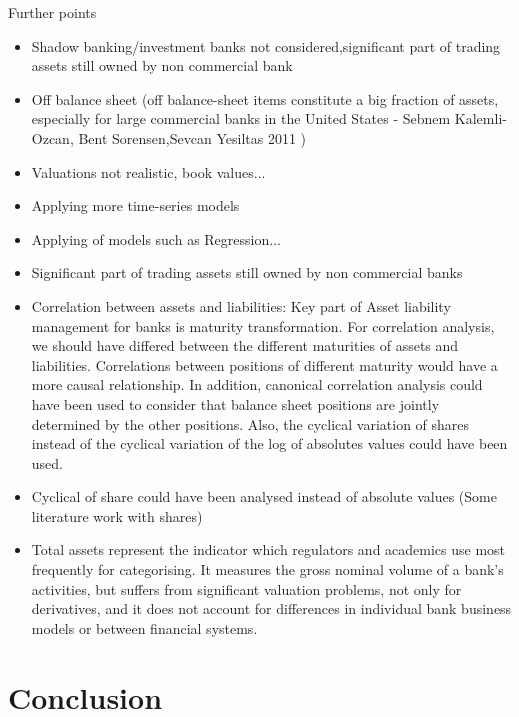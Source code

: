 \documentclass[12pt, a4paper]{article} %
\begin{document}
Further points
\begin{itemize}
\item Shadow banking/investment banks not considered,significant part of trading assets still owned by non commercial bank
\item Off balance sheet (off balance-sheet
items constitute a big fraction of assets, especially for large commercial banks in the United
States - Sebnem Kalemli-Ozcan, Bent Sorensen,Sevcan Yesiltas 2011 )
\item Valuations not realistic, book values...
\item Applying more time-series models
\item Applying of models such as Regression...
\item Significant part of trading assets still owned by non commercial banks
\item Correlation between assets and liabilities: Key part of Asset liability management for banks is maturity transformation. For correlation analysis, we should have differed between the different maturities of assets and liabilities. Correlations between positions of different maturity would have a more causal relationship. In addition, canonical correlation analysis could have been used to consider that balance sheet positions are jointly determined by the other positions. Also, the cyclical variation of shares instead of the cyclical variation of the log of absolutes values could have been used.
\item Cyclical of share could have been analysed instead of absolute values (Some literature work with shares)
\item Total assets represent the indicator which regulators and academics use most
frequently for categorising. It measures the gross nominal volume of a bank’s activities, but
suffers from significant valuation problems, not only for derivatives, and it does
not account for differences in individual bank business models or between
financial systems.
\end{itemize}
 



\section{Conclusion}




\end{document}
